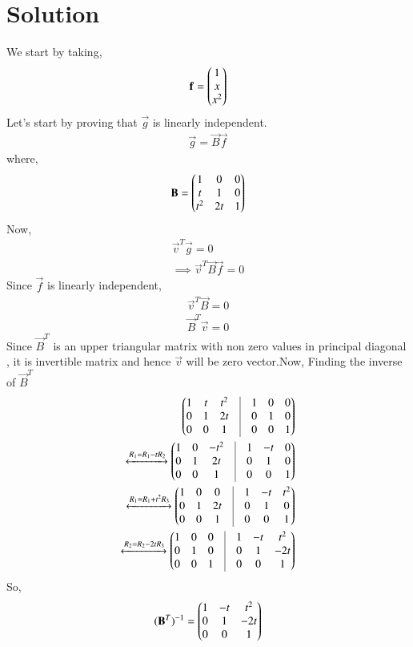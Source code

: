 \documentclass[journal,12pt,twocolumn]{IEEEtran}
\begin{document}
   \section{\textbf{Solution}}
   We start by taking,\begin{align}\mathbf{f}=\begin{pmatrix}1\\x\\x^2\end{pmatrix}\end{align}
   Let's start by proving that $\vec{g}$ is linearly independent.
    \begin{align}
    \vec{g}=\vec{B}\vec{f}
    \end{align}
    where,
    \begin{align}
    \mathbf{B}=\begin{pmatrix}1&0&0\\t&1&0\\t^2&2t&1\end{pmatrix}
    \end{align}
    Now,
    \begin{align}
    \vec{v}^T\vec{g}=0\\
    \implies \vec{v}^T\vec{B}\vec{f}=0
    \end{align}
    Since $\vec{f}$ is linearly independent,
    \begin{align}
     \vec{v}^T\vec{B}=0\\
     \vec{B}^T\vec{v}=0
    \end{align}
   Since $\vec{B}^T$ is an upper triangular matrix with non zero values in principal diagonal  , it is invertible matrix and hence $\vec{v}$ will be zero vector.Now, Finding the inverse of $\vec{B}^T$
   \begin{align}
   \myvec{1&t&t^2&\vrule&1&0&0\\0&1&2t&\vrule&0&1&0\\0&0&1&\vrule&0&0&1}\\
  \xleftrightarrow{R_1=R_1-tR_2} \myvec{1&0&-t^2&\vrule&1&-t&0\\0&1&2t&\vrule&0&1&0\\0&0&1&\vrule&0&0&1}\\
 \xleftrightarrow{R_1=R_1+t^2R_3}  \myvec{1&0&0&\vrule&1&-t&t^2\\0&1&2t&\vrule&0&1&0\\0&0&1&\vrule&0&0&1}\\
   \xleftrightarrow{R_2=R_2-2tR_3} \myvec{1&0&0&\vrule&1&-t&t^2\\0&1&0&\vrule&0&1&-2t\\0&0&1&\vrule&0&0&1}
   \end{align}
   So, 
   \begin{align}
   (\mathbf{B}^{T})^{-1}=\begin{pmatrix}1&-t&t^2\\0&1&-2t\\0&0&1\end{pmatrix}\label{inverse}
   \end{align}
\end{document}
